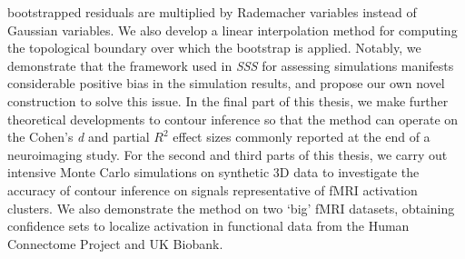 \documentclass[11pt,a4paper]{report}      %
\begin{document}
\begin{thesisabstract}
\begin{singlespace}
bootstrapped residuals are multiplied by Rademacher variables instead of Gaussian variables. We also develop a linear interpolation method for computing the topological boundary over which the bootstrap is applied. Notably, we demonstrate that the framework used in \textit{SSS} for assessing simulations manifests considerable positive bias in the simulation results, and propose our own novel construction to solve this issue. In the final part of this thesis, we make further theoretical developments to contour inference so that the method can operate on the Cohen's \textit{d} and partial $R^{2}$ effect sizes commonly reported at the end of a neuroimaging study. For the second and third parts of this thesis, we carry out intensive Monte Carlo simulations on synthetic 3D data to investigate the accuracy of contour inference on signals representative of fMRI activation clusters. We also demonstrate the method on two `big' fMRI datasets, obtaining confidence sets to localize activation in functional data from the Human Connectome Project and UK Biobank.	


\end{singlespace}
\end{thesisabstract}


\begin{thesisacknowledgments}        %

\end{thesisacknowledgments}
\end{document}
